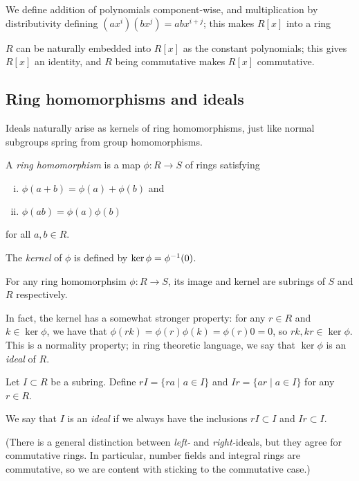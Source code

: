 We define addition of polynomials component-wise, and multiplication by distributivity defining $(ax^i)(bx^j)=abx^{i+j}$; this makes $R[x]$ into a ring

$R$ can be naturally embedded into $R[x]$ as the constant polynomials; this gives $R[x]$ an identity, and $R$ being commutative makes $R[x]$ commutative.



\subsection{Ring homomorphisms and ideals}

Ideals naturally arise as kernels of ring homomorphisms, just like normal subgroups spring from group homomorphisms.

\begin{definition}
	A \emph{ring homomorphism} is a map $\phi:R\to S$ of rings satisfying
	\begin{enumerate}[(i)]
		\item $\phi(a+b)=\phi(a)+\phi(b)$ and
		\item $\phi(ab)=\phi(a)\phi(b)$
	\end{enumerate}
	for all $a,b\in R$.

	The \emph{kernel} of $\phi$ is defined by $\ker\phi=\phi^{-1}(0)$.
\end{definition}

\begin{proposition}
	For any ring homomorphsim $\phi:R\to S$, its image and kernel are subrings of $S$ and $R$ respectively.
\end{proposition}

In fact, the kernel has a somewhat stronger property: for any $r\in R$ and $k\in\ker\phi$, we have that $\phi(rk)=\phi(r)\phi(k)=\phi(r)0=0$, so $rk,kr\in\ker\phi$. This is a normality property; in ring theoretic language, we say that $\ker\phi$ is an \emph{ideal} of $R$.

\begin{definition}
	Let $I\subset R$ be a subring. Define $rI=\{ra \mid a\in I\}$ and $Ir=\{ar \mid a\in I\}$ for any $r\in R$.

	We say that $I$ is an \emph{ideal} if we always have the inclusions $rI\subset I$ and $Ir\subset I$.
\end{definition}

(There is a general distinction between \emph{left-} and \emph{right-}ideals, but they agree for commutative rings. In particular, number fields and integral rings are commutative, so we are content with sticking to the commutative case.)

